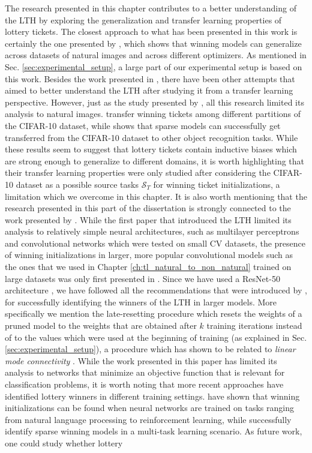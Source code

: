 The research presented in this chapter contributes to a better understanding of the LTH by exploring the generalization and transfer learning properties of lottery tickets. The closest approach to what has been presented in this work is certainly the one presented by \citet{morcos2019one}, which shows that winning models can generalize across datasets of natural images and across different optimizers. As mentioned in Sec. \ref{sec:experimental_setup}, a large part of our experimental setup is based on this work. Besides the work presented in \cite{morcos2019one}, there have been other attempts that aimed to better understand the LTH after studying it from a transfer learning perspective. However, just as the study presented by \citet{morcos2019one}, all this research limited its analysis to natural images. \citet{van2019using} transfer winning tickets among different partitions of the CIFAR-10 dataset, while \citet{mehta2019sparse} shows that sparse models can successfully get transferred from the CIFAR-10 dataset to other object recognition tasks. While these results seem to suggest that lottery tickets contain inductive biases which are strong enough to generalize to different domains, it is worth highlighting that their transfer learning properties were only studied after considering the CIFAR-10 dataset as a possible source tasks $\mathcal{S}_T$ for winning ticket initializations, a limitation which we overcome in this chapter. It is also worth mentioning that the research presented in this part of the dissertation is strongly connected to the work presented by \citet{franklestabilizing}. While the first paper that introduced the LTH limited its analysis to relatively simple neural architectures, such as multilayer perceptrons and convolutional networks which were tested on small CV datasets, the presence of winning initializations in larger, more popular convolutional models such as the ones that we used in Chapter \ref{ch:tl_natural_to_non_natural} trained on large datasets \cite{russakovsky2015imagenet} was only first presented in \cite{franklestabilizing}. Since we have used a ResNet-50 architecture \cite{he2016deep}, we have followed all the recommendations that were introduced by \citet{franklestabilizing}, for successfully identifying the winners of the LTH in larger models. More specifically we mention the late-resetting procedure which resets the weights of a pruned model to the weights that are obtained after $k$ training iterations instead of to the values which were used at the beginning of training (as explained in Sec. \ref{sec:experimental_setup}), a procedure which has shown to be related to \textit{linear mode connectivity} \cite{frankle2019linear}. While the work presented in this paper has limited its analysis to networks that minimize an objective function that is relevant for classification problems, it is worth noting that more recent approaches have identified lottery winners in different training settings. \citet{yu2019playing} have shown that winning initializations can be found when neural networks are trained on tasks ranging from natural language processing to reinforcement learning, while \citet{sun2019learning} successfully identify sparse winning models in a multi-task learning scenario. As future work, one could study whether lottery 